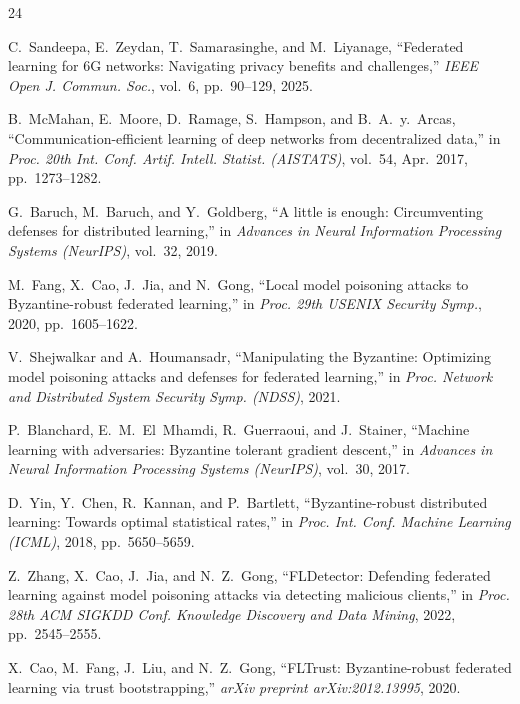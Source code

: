 \documentclass[journal]{IEEEtran}
\begin{document}
\begin{thebibliography}{24}

C.~Sandeepa, E.~Zeydan, T.~Samarasinghe, and M.~Liyanage, ``Federated learning for 6G networks: Navigating privacy benefits and challenges,'' \textit{IEEE Open J. Commun. Soc.}, vol.~6, pp.~90--129, 2025.

B.~McMahan, E.~Moore, D.~Ramage, S.~Hampson, and B.~A.~y.~Arcas, ``Communication-efficient learning of deep networks from decentralized data,'' in \textit{Proc. 20th Int. Conf. Artif. Intell. Statist. (AISTATS)}, vol.~54, Apr.~2017, pp.~1273--1282.

G.~Baruch, M.~Baruch, and Y.~Goldberg, ``A little is enough: Circumventing defenses for distributed learning,'' in \textit{Advances in Neural Information Processing Systems (NeurIPS)}, vol.~32, 2019.

M.~Fang, X.~Cao, J.~Jia, and N.~Gong, ``Local model poisoning attacks to Byzantine-robust federated learning,'' in \textit{Proc. 29th USENIX Security Symp.}, 2020, pp.~1605--1622.

V.~Shejwalkar and A.~Houmansadr, ``Manipulating the Byzantine: Optimizing model poisoning attacks and defenses for federated learning,'' in \textit{Proc. Network and Distributed System Security Symp. (NDSS)}, 2021.

P.~Blanchard, E.~M.~El~Mhamdi, R.~Guerraoui, and J.~Stainer, ``Machine learning with adversaries: Byzantine tolerant gradient descent,'' in \textit{Advances in Neural Information Processing Systems (NeurIPS)}, vol.~30, 2017.

D.~Yin, Y.~Chen, R.~Kannan, and P.~Bartlett, ``Byzantine-robust distributed learning: Towards optimal statistical rates,'' in \textit{Proc. Int. Conf. Machine Learning (ICML)}, 2018, pp.~5650--5659.

Z.~Zhang, X.~Cao, J.~Jia, and N.~Z.~Gong, ``FLDetector: Defending federated learning against model poisoning attacks via detecting malicious clients,'' in \textit{Proc. 28th ACM SIGKDD Conf. Knowledge Discovery and Data Mining}, 2022, pp.~2545--2555.

X.~Cao, M.~Fang, J.~Liu, and N.~Z.~Gong, ``FLTrust: Byzantine-robust federated learning via trust bootstrapping,'' \textit{arXiv preprint arXiv:2012.13995}, 2020.


\end{thebibliography}
\end{document}
